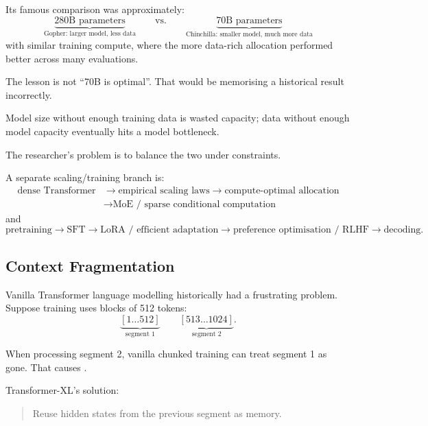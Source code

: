 Its famous comparison was approximately:
\[
\underbrace{280\text{B parameters}}_{\text{Gopher: larger model, less data}}
\qquad\text{vs.}\qquad
\underbrace{70\text{B parameters}}_{\text{Chinchilla: smaller model, much more data}}
\]
with similar training compute, where the more data-rich allocation performed better across many evaluations.

The lesson is not ``70B is optimal''.
That would be memorising a historical result incorrectly.

\begin{calloutmemoryhook}
Model size without enough training data is wasted capacity; data without enough model capacity eventually hits a model bottleneck.
\end{calloutmemoryhook}

The researcher's problem is to balance the two under constraints.








A separate scaling/training branch is:
\[
\begin{aligned}
\text{dense Transformer}
&\rightarrow
\text{empirical scaling laws}
\rightarrow
\text{compute-optimal allocation}\\
&\rightarrow
\text{MoE / sparse conditional computation}
\end{aligned}
\]
and
\[
\text{pretraining}
\rightarrow
\text{SFT}
\rightarrow
\text{LoRA / efficient adaptation}
\rightarrow
\text{preference optimisation / RLHF}
\rightarrow
\text{decoding}.
\]






\subsection{Context Fragmentation}
\label{subsec:modern-transformer-xl}
Vanilla Transformer language modelling historically had a frustrating problem.
Suppose training uses blocks of 512 tokens:
\[
\underbrace{[1\ldots512]}_{\text{segment 1}}
\qquad
\underbrace{[513\ldots1024]}_{\text{segment 2}}.
\]

When processing segment 2, vanilla chunked training can treat segment 1 as gone.
That causes \textbf{}.

Transformer-XL's solution:

\begin{quote}
Reuse hidden states from the previous segment as memory.
\end{quote}

